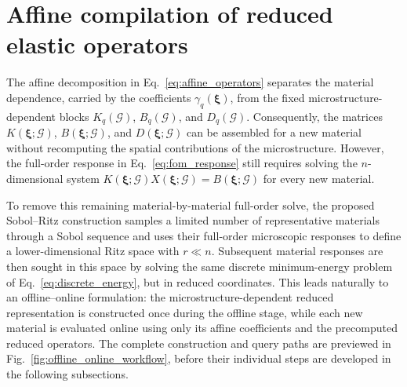 \documentclass[pdflatex,sn-basic,Numbered]{sn-jnl}
\newcommand{\G}{\mathcal{G}}
\begin{document}
\section{Affine compilation of reduced elastic operators}
\label{sec:transfer}

The affine decomposition in Eq.~\eqref{eq:affine_operators} separates the
material dependence, carried by the coefficients
\(\gamma_q(\boldsymbol\xi)\), from the fixed microstructure-dependent blocks
\(K_q(\G)\), \(B_q(\G)\), and \(D_q(\G)\). Consequently, the matrices
\(K(\boldsymbol\xi;\G)\), \(B(\boldsymbol\xi;\G)\), and
\(D(\boldsymbol\xi;\G)\) can be assembled for a new material without
recomputing the spatial contributions of the microstructure. However, the
full-order response in Eq.~\eqref{eq:fom_response} still requires solving the
\(n\)-dimensional system
\(K(\boldsymbol\xi;\G)X(\boldsymbol\xi;\G)=B(\boldsymbol\xi;\G)\)
for every new material.

To remove this remaining material-by-material full-order solve, the proposed
Sobol--Ritz construction samples a limited number of representative materials
through a Sobol sequence and uses their full-order microscopic responses to
define a lower-dimensional Ritz space with \(r\ll n\). Subsequent material
responses are then sought in this space by solving the same discrete
minimum-energy problem of Eq.~\eqref{eq:discrete_energy}, but in reduced
coordinates. This leads naturally to an offline--online formulation: the
microstructure-dependent reduced representation is constructed once during
the offline stage, while each new material is evaluated online using only its
affine coefficients and the precomputed reduced operators. The complete
construction and query paths are previewed in
Fig.~\ref{fig:offline_online_workflow}, before their individual steps are developed
in the following subsections.
\end{document}
